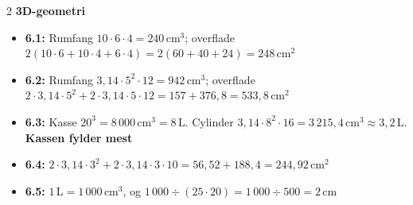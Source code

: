 \documentclass[11pt,a4paper]{article}
\begin{document}
\begin{multicols}{2}
\noindent\textbf{3D-geometri}
\begin{itemize}[leftmargin=1.3em, itemsep=1pt, topsep=2pt]
  \item \textbf{6.1:} Rumfang $10 \cdot 6 \cdot 4 = 240\,\text{cm}^{3}$;
        overflade $2(10\cdot 6 + 10\cdot 4 + 6\cdot 4)
        = 2(60 + 40 + 24) = 248\,\text{cm}^{2}$
  \item \textbf{6.2:} Rumfang $3{,}14 \cdot 5^{2} \cdot 12 = 942\,\text{cm}^{3}$;
        overflade $2\cdot 3{,}14 \cdot 5^{2} + 2\cdot 3{,}14 \cdot 5 \cdot 12
        = 157 + 376{,}8 = 533{,}8\,\text{cm}^{2}$
  \item \textbf{6.3:} Kasse $20^{3} = 8\,000\,\text{cm}^{3} = 8\,\text{L}$.
        Cylinder $3{,}14 \cdot 8^{2} \cdot 16 = 3\,215{,}4\,\text{cm}^{3}
        \approx 3{,}2\,\text{L}$. \textbf{Kassen fylder mest}
  \item \textbf{6.4:} $2 \cdot 3{,}14 \cdot 3^{2} + 2 \cdot 3{,}14 \cdot 3 \cdot 10
        = 56{,}52 + 188{,}4 = 244{,}92\,\text{cm}^{2}$
  \item \textbf{6.5:} $1\,\text{L} = 1\,000\,\text{cm}^{3}$, og
        $1\,000 \div (25 \cdot 20) = 1\,000 \div 500 = 2\,\text{cm}$
\end{itemize}

\end{multicols}
\end{document}
